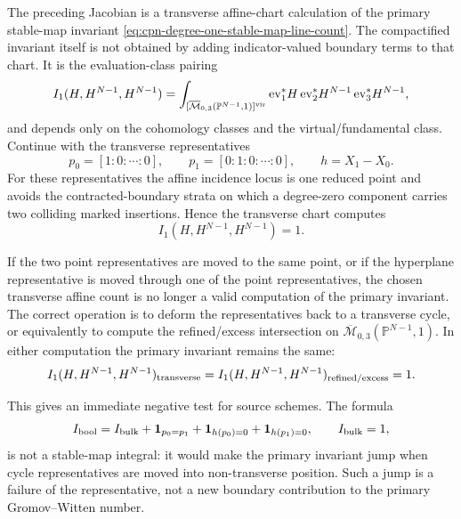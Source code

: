 \begin{example}
\label{ex:cpn-degree-one-representative-independence-gate}
The preceding Jacobian is a transverse affine-chart calculation of the primary
stable-map invariant
\eqref{eq:cpn-degree-one-stable-map-line-count}.  The compactified invariant
itself is not obtained by adding indicator-valued boundary terms to that chart.
It is the evaluation-class pairing
\[
  I_1(H,H^{N-1},H^{N-1})
  =
  \int_{[\overline{\mathcal M}_{0,3}(\mathbb P^{N-1},1)]^{\rm vir}}
  {\rm ev}_1^\ast H\,
  {\rm ev}_2^\ast H^{N-1}\,
  {\rm ev}_3^\ast H^{N-1},
\]
and depends only on the cohomology classes and the virtual/fundamental class.
Continue with the transverse representatives
\[
  p_0=[1:0:\cdots:0],\qquad
  p_1=[0:1:0:\cdots:0],\qquad
  h=X_1-X_0 .
\]
For these representatives the affine incidence locus is one reduced point and
avoids the contracted-boundary strata on which a degree-zero component carries
two colliding marked insertions.  Hence the transverse chart computes
\begin{equation}
  I_1(H,H^{N-1},H^{N-1})=1.
  \label{eq:cpn-degree-one-primary-representative-independence}
\end{equation}

If the two point representatives are moved to the same point, or if the
hyperplane representative is moved through one of the point representatives,
the chosen transverse affine count is no longer a valid computation of the
primary invariant.  The correct operation is to deform the representatives back
to a transverse cycle, or equivalently to compute the refined/excess
intersection on
\(\overline{\mathcal M}_{0,3}(\mathbb P^{N-1},1)\).  In either computation the
primary invariant remains the same:
\begin{equation}
  I_1(H,H^{N-1},H^{N-1})_{\rm transverse}
  =
  I_1(H,H^{N-1},H^{N-1})_{\rm refined/excess}
  =
  1 .
  \label{eq:cpn-degree-one-excess-invariance}
\end{equation}

This gives an immediate negative test for source schemes.  The formula
\begin{equation}
  I_{\rm bool}
  =
  I_{\rm bulk}
  +{\bf 1}_{p_0=p_1}
  +{\bf 1}_{h(p_0)=0}
  +{\bf 1}_{h(p_1)=0},
  \qquad I_{\rm bulk}=1,
  \label{eq:cpn-degree-one-boolean-boundary-negative-control}
\end{equation}
is not a stable-map integral: it would make the primary invariant jump when
cycle representatives are moved into non-transverse position.  Such a jump is a
failure of the representative, not a new boundary contribution to the primary
Gromov--Witten number.


\end{example}
